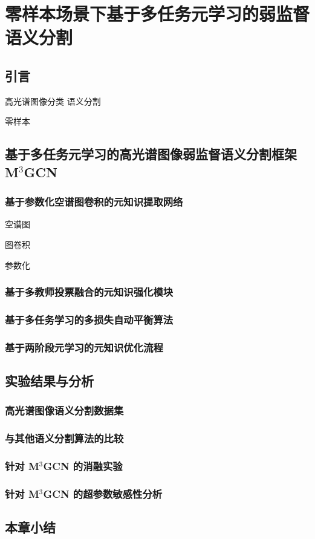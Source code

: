 \chapter{零样本场景下基于多任务元学习的弱监督语义分割}
\section{引言}
高光谱图像分类 \rightarrow 语义分割
\par
零样本
\section{基于多任务元学习的高光谱图像弱监督语义分割框架 M$^3$GCN}
\subsection{基于参数化空谱图卷积的元知识提取网络}
空谱图
\par
图卷积
\par
参数化
\subsection{基于多教师投票融合的元知识强化模块}
\subsection{基于多任务学习的多损失自动平衡算法}
\subsection{基于两阶段元学习的元知识优化流程}
\section{实验结果与分析}
\subsection{高光谱图像语义分割数据集}
\subsection{与其他语义分割算法的比较}
\subsection{针对 M$^3$GCN 的消融实验}
\subsection{针对 M$^3$GCN 的超参数敏感性分析}
\section{本章小结}
